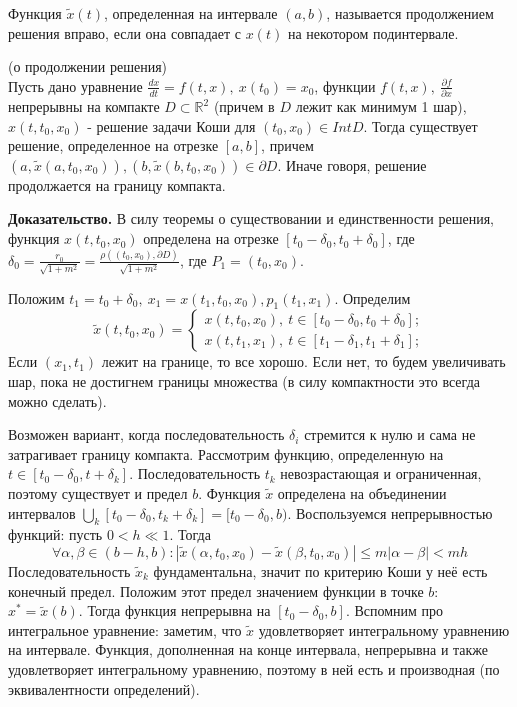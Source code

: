 \begin{defin}
Функция $\tilde x(t)$, определенная на интервале $(a,b)$, называется 
продолжением решения вправо, если она совпадает с $x(t)$ на некотором
подинтервале.
\end{defin}

\begin{theor}
    (о продолжении решения)\\
    Пусть дано уравнение $\frac{dx}{dt}=f(t,x),~x(t_0)=x_0$, 
    функции $f(t,x),~\frac{\partial f}{\partial x}$ непрерывны на компакте
    $D\subset \mathbb{R}^2$ (причем в $D$ лежит как минимум 1 шар),
    $x(t,t_0,x_0)$ - решение задачи Коши для  $(t_0,x_0)\in Int D$. 
    Тогда существует решение, определенное на отрезке $[a,b]$, причем
     $(a,\tilde x(a,t_0,x_0)),(b,\tilde x(b,t_0,x_0))\in \partial D$.
     Иначе говоря, решение продолжается на границу компакта.
\end{theor}
\textbf{Доказательство.} В силу теоремы о существовании и единственности 
решения, функция $x(t,t_0,x_0)$ определена на отрезке $[t_0-\delta_0,
t_0+\delta_0]$, где $\delta_0=\frac{r_0}{\sqrt{1+m^2} }= \frac{\rho((t_0,x_0),
\partial D)}{\sqrt{1+m^2} }$, где $P_1=(t_0,x_0)$. 

Положим $t_1=t_0+\delta_0,~x_1=x(t_1,t_0,x_0),p_1(t_1,x_1)$. 
Определим 
$$\tilde x(t,t_0,x_0)=\begin{cases}
    x(t,t_0,x_0),~t\in [t_0-\delta_0,t_0+\delta_0];\\
    x(t,t_1,x_1),~t\in [t_1-\delta_1,t_1+\delta_1];
\end{cases}$$
Если $(x_1,t_1)$ лежит на границе, то все хорошо. Если нет, то будем 
увеличивать шар, пока не достигнем границы множества (в силу компактности 
это всегда можно сделать). 

Возможен вариант, когда последовательность $\delta_i$ стремится к нулю и 
сама не затрагивает границу компакта. Рассмотрим функцию, определенную 
на $t\in [t_0-\delta_0,t+\delta_k]$. Последовательность 
$t_k$ невозрастающая и ограниченная, поэтому существует и предел 
$b$. Функция $\tilde x$  определена на объединении интервалов
$\bigcup\limits_{k}[t_0-\delta_0,t_k+\delta_k]=[t_0-\delta_0,b)$.
Воспользуемся непрерывностью функций: пусть $0<h\ll1$.
Тогда $$\forall \alpha,\beta\in (b-h,b):|\tilde x(\alpha,t_0,x_0)-
\tilde x(\beta,t_0,x_0)|\leqslant m|\alpha-\beta|<mh$$ 
Последовательность $\tilde x_k$ фундаментальна, значит по критерию Коши 
у неё есть конечный предел. Положим этот предел значением функции 
в точке $b$:  $x^*=\tilde x(b)$. Тогда функция непрерывна на $[t_0-\delta_0,
b]$. Вспомним про интегральное уравнение: заметим, что $\tilde x$ 
удовлетворяет интегральному уравнению на интервале. Функция, дополненная
на конце интервала, непрерывна и также удовлетворяет интегральному 
уравнению, поэтому в ней есть и производная (по эквивалентности
определений).


